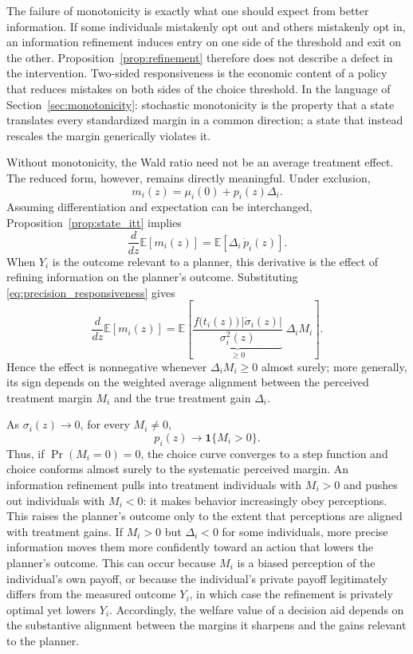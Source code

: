 \documentclass[11pt]{article}
\newcommand{\E}{\mathbb{E}}
\newcommand{\1}{\mathbf{1}}
\begin{document}
The failure of monotonicity is exactly what one should expect from better
information. If some individuals mistakenly opt out and others mistakenly
opt in, an information refinement induces entry on one side of the
threshold and exit on the other. Proposition~\ref{prop:refinement}
therefore does not describe a defect in the intervention. Two-sided
responsiveness is the economic content of a policy that reduces mistakes on
both sides of the choice threshold. In the language of
Section~\ref{sec:monotonicity}: stochastic monotonicity is the property
that a state translates every standardized margin in a common direction;
a state that instead rescales the margin generically violates it.

Without monotonicity, the Wald ratio need not be an average treatment
effect. The reduced form, however, remains directly meaningful. Under
exclusion,
\[
m_i(z)=\mu_i(0)+p_i(z)\Delta_i.
\]
Assuming differentiation and expectation can be interchanged,
Proposition~\ref{prop:state_itt} implies
\[
\frac{d}{dz}\E[m_i(z)]
=
\E[\Delta_i\,\dot p_i(z)].
\]
When \(Y_i\) is the outcome relevant to a planner, this derivative is the
effect of refining information on the planner's outcome. Substituting
\eqref{eq:precision_responsiveness} gives
\[
\frac{d}{dz}\E[m_i(z)]
=
\E\!\left[
\underbrace{\frac{f\big(t_i(z)\big)\,\lvert\dot\sigma_i(z)\rvert}
{\sigma_i^2(z)}}_{\geq 0}
\;\Delta_i M_i
\right].
\]
Hence the effect is nonnegative whenever \(\Delta_i M_i\geq 0\) almost
surely; more generally, its sign depends on the weighted average alignment
between the perceived treatment margin \(M_i\) and the true treatment gain
\(\Delta_i\).

As \(\sigma_i(z)\to0\), for every \(M_i\neq0\),
\[
p_i(z)\longrightarrow\1\{M_i>0\}.
\]
Thus, if \(\Pr(M_i=0)=0\), the choice curve converges to a step function
and choice conforms almost surely to the systematic perceived margin. An
information refinement pulls into treatment individuals with \(M_i>0\) and
pushes out individuals with \(M_i<0\): it makes behavior increasingly obey
perceptions. This raises the planner's outcome only to the extent that
perceptions are aligned with treatment gains. If \(M_i>0\) but
\(\Delta_i<0\) for some individuals, more precise information moves them
more confidently toward an action that lowers the planner's outcome. This
can occur because \(M_i\) is a biased perception of the individual's own
payoff, or because the individual's private payoff legitimately differs
from the measured outcome \(Y_i\), in which case the refinement is
privately optimal yet lowers \(Y_i\). Accordingly, the welfare value of a
decision aid depends on the substantive alignment between the margins it
sharpens and the gains relevant to the planner.
\end{document}

